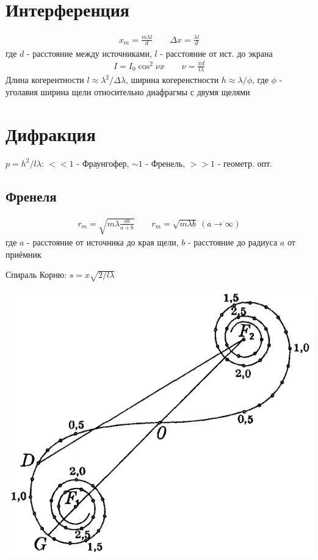 \documentclass[10pt,twocolumn]{article}
\begin{document}
\section{Интерференция}
\begin{gather*}
  x_m = \frac{m\lambda l}{d} \qquad \Delta x = \frac{\lambda l}{d}
\end{gather*}
где $d$ - расстояние между источниками, $l$ - расстояние от ист. до экрана
\begin{gather*}
  I=I_0 \cos^{2}\nu x \qquad \nu=\frac{\pi d}{l\lambda}
\end{gather*}
Длина когерентности $l\approx \lambda^{2}/\Delta\lambda$, ширина когеренстности $h\approx \lambda/\phi$,
где $\phi$ - уголавия ширина щели относительно диафрагмы с двумя щелями

\section{Дифракция}
$p=h^{2}/l\lambda$: $<<1$ - Фраунгофер, $\sim 1$ - Френель, $>>1$ - геометр. опт.
\subsection{Френеля}
\begin{gather*}
  r_m=\sqrt{m\lambda \frac{ab}{a+b}} \qquad r_m=\sqrt{m\lambda b} \ (a \to \infty)
\end{gather*}
где $a$ - расстояние от источника до края щели, $b$ - расстояние до радиуса $a$ от приёмник

Спираль Корню: $s=x\sqrt{2/l\lambda}$

\includegraphics[scale=0.3]{figures/cornu}
\end{document}
